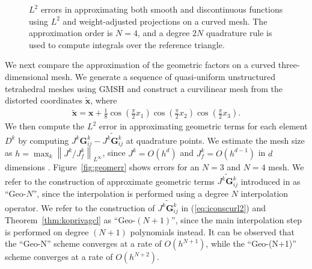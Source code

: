 \documentclass[preprint,10pt]{article}
\newcommand{\logLogSlopeTriangleFlip}[5]
{

    \pgfplotsextra
    {
        \pgfkeysgetvalue{/pgfplots/xmin}{\xmin}
        \pgfkeysgetvalue{/pgfplots/xmax}{\xmax}
        \pgfkeysgetvalue{/pgfplots/ymin}{\ymin}
        \pgfkeysgetvalue{/pgfplots/ymax}{\ymax}

        \pgfmathsetmacro{\xBrel}{#1-#2}
        \pgfmathsetmacro{\yBrel}{#3}
        \pgfmathsetmacro{\xCrel}{#1}

        \pgfmathsetmacro{\lnxB}{\xmin*(1-(#1-#2))+\xmax*(#1-#2)} %
        \pgfmathsetmacro{\lnxA}{\xmin*(1-#1)+\xmax*#1} %
        \pgfmathsetmacro{\lnyA}{\ymin*(1-#3)+\ymax*#3} %
        \pgfmathsetmacro{\lnyC}{\lnyA+#4*(\lnxA-\lnxB)}
        \pgfmathsetmacro{\yCrel}{\lnyC-\ymin)/(\ymax-\ymin)} %

	\pgfmathsetmacro{\xArel}{\xBrel}
        \pgfmathsetmacro{\yArel}{\yCrel}

        \coordinate (A) at (rel axis cs:\xArel,\yArel);
        \coordinate (B) at (rel axis cs:\xBrel,\yBrel);
        \coordinate (C) at (rel axis cs:\xCrel,\yCrel);

        \draw[#5]   (A)-- node[pos=0.5,anchor=east] {#4}
                    (B)-- 
                    (C)-- node[pos=0.5,anchor=south] {}
                    cycle;
    }
}
\theoremstyle{definition}
\theoremstyle{lemma}
\theoremstyle{theorem}
\theoremstyle{assumption}
\renewcommand{\hat}{\widehat}
\renewcommand{\tilde}{\widetilde}
\newcommand{\nor}[1]{\left\| #1 \right\|}
\newcommand{\LRp}[1]{\left( #1 \right)}
\begin{document}
{\begin{figure}
{
}
\caption{$L^2$ errors in approximating both smooth and discontinuous functions using $L^2$ and weight-adjusted projections on a curved mesh.  The approximation order is $N=4$, and a degree $2N$ quadrature rule is used to compute integrals over the reference triangle. }
\label{fig:superconverge}
\end{figure}

We next compare the approximation of the geometric factors on a curved three-dimensional mesh.  We generate a sequence of quasi-uniform unstructured tetrahedral meshes using GMSH \cite{geuzaine2009gmsh} and construct a curvilinear mesh from the distorted coordinates $\tilde{\bm{x}}$, where
\begin{align}
\tilde{\bm{x}} = \bm{x} + \frac{1}{8}\cos\LRp{\frac{\pi}{2}x_1}\cos\LRp{\frac{\pi}{2}x_2}\cos\LRp{\frac{\pi}{2}x_3}.  
\label{eq:mapping}
\end{align}
We then compute the $L^2$ error in approximating geometric terms for each element $D^k$ by computing $J^k\bm{G}^k_{ij}-\tilde{J^k\bm{G}^k_{ij}}$ at quadrature points.  
We estimate the mesh size as $h = \max_k \nor{J^k/J^k_f}_{L^{\infty}}$, since $J^k = O(h^d)$ and $J^k_f = O(h^{d-1})$ in $d$ dimensions \cite{chan2015gpu}.  Figure~\ref{fig:geomerr} shows errors for an $N=3$ and $N=4$ mesh.  We refer to the construction of approximate geometric terms $\tilde{J^k\bm{G}^k_{ij}}$ introduced in \cite{kopriva2006metric, hindenlang2012explicit} as ``Geo-$N$'', since the interpolation is performed using a degree $N$ interpolation operator.  We refer to the construction of $\tilde{J^k\bm{G}^k_{ij}}$ in (\ref{eq:iconscurl2}) and Theorem~\ref{thm:koprivagcl} as ``Geo-$(N+1)$'', since the main interpolation step is performed on degree $(N+1)$ polynomials instead.  It can be observed that the ``Geo-N'' scheme converges at a rate of $O(h^{N+1})$, while the ``Geo-(N+1)'' scheme converges at a rate of $O(h^{N+2})$.  

}
\end{document}
